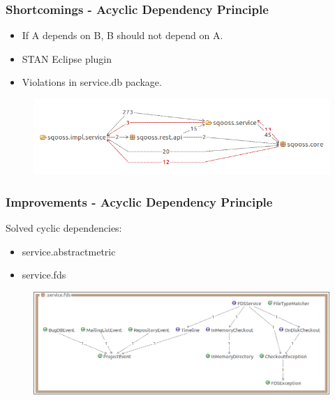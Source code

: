 \documentclass{beamer}
\begin{document}
\begin{frame}
    \frametitle{Shortcomings - Acyclic Dependency Principle}
    \begin{itemize}
        \item If A depends on B, B should not depend on A.
        \item STAN Eclipse plugin        
        \item Violations in service.db package.
    \end{itemize}
    
    \begin{figure}
    	\centering
    	\includegraphics[width=\textwidth]{../img/cycle1.png}
    \end{figure}
\end{frame}

\begin{frame}
    \frametitle{Improvements - Acyclic Dependency Principle}
    Solved cyclic dependencies:
    \begin{itemize}
        \item service.abstractmetric
        \item service.fds
    \end{itemize}
    
    \begin{figure}
    	\centering
    	\includegraphics[width=\textwidth]{../img/fds-after.png}
    \end{figure}
\end{frame}
\end{document}
